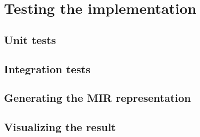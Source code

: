 \chapter{Testing the implementation}

\section{Unit tests}

\section{Integration tests}

\section{Generating the MIR representation}

\section{Visualizing the result}

\bigskip